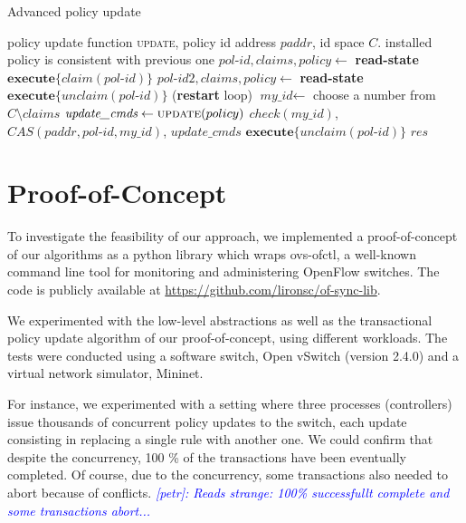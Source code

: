 \documentclass[conference]{sigcomm-alternate}
\newcommand{\claimcheck}{check\xspace}
\newcommand{\paddr}{\textit{paddr}\xspace}
\newcommand{\pid}{\textit{pol-id}\xspace}
\newcommand{\ufunc}{update} %
\newcommand{\petr}[1]{\textit{\textcolor{blue}{[petr]: #1}}} %
\newcommand{\ack}{\textit{ack}}
\begin{document}
{\scriptsize
\begin{algorithm}[t]
    \caption{Advanced policy update}
    \label{alg:update}
    \begin{algorithmic}[1]
        \Require policy update function \textsc{\ufunc}, policy id address $\paddr$, id space $C$.
    \Ensure installed policy is consistent with previous one
 		\Repeat
		 	\State $\pid,claims,policy\gets$ \textbf{read-state} \label{update:read-state1} %
 			\State $\textbf{execute}\{claim(\pid)\}$
 			\State $\pid 2,\textit{claims},\textit{policy}\gets$ \textbf{read-state} \label{update:read-state2} %
 			\If {$\pid\neq \pid 2$}
	 			\State $\textbf{execute} \{\textit{unclaim}(\pid)\}$
 				 (\textbf{restart} loop)
 			\EndIf
 			\State $\textit{my\_id}\gets$ choose a number from $C\setminus claims$
 			\State $\textit{update\_cmds}\gets \textsc{\ufunc}(policy)$ \label{update:compute}
 			\startTxn
 				\State $\claimcheck(my\_id)$,
	 			\State $CAS(\paddr, \pid,my\_id)$,
	 			\State $\textit{update\_cmds}$ %
 			\endTxn
	 		\State $\textbf{execute} \{\textit{unclaim}(\pid)\}$
     	\Until{$res=\ack$}
			\Return $\textit{res}$

    \end{algorithmic}
\end{algorithm}
}


\section{Proof-of-Concept}

To investigate the feasibility of our approach,
we implemented a proof-of-concept of our algorithms
as a python library which wraps ovs-ofctl, 
a well-known command line tool for monitoring and administering OpenFlow switches. 
The code is publicly available at \url{https://github.com/lironsc/of-sync-lib}.

We experimented with the low-level abstractions as well as the 
transactional policy update algorithm of our proof-of-concept, using
different workloads. 
The tests were conducted using a software switch, Open vSwitch (version 2.4.0) and
a virtual network simulator, Mininet.

For instance, we experimented with a setting where three processes
(controllers) issue thousands of concurrent policy updates
to the switch, 
each update consisting in replacing a single rule with another one.
We could confirm that 
despite the concurrency, 100 \% of the transactions have been
eventually completed.
Of course, due to the concurrency, some transactions also needed to abort
because of conflicts. 
\petr{Reads strange: 100\% successfullt complete and some transactions
  abort...} 
\end{document}
